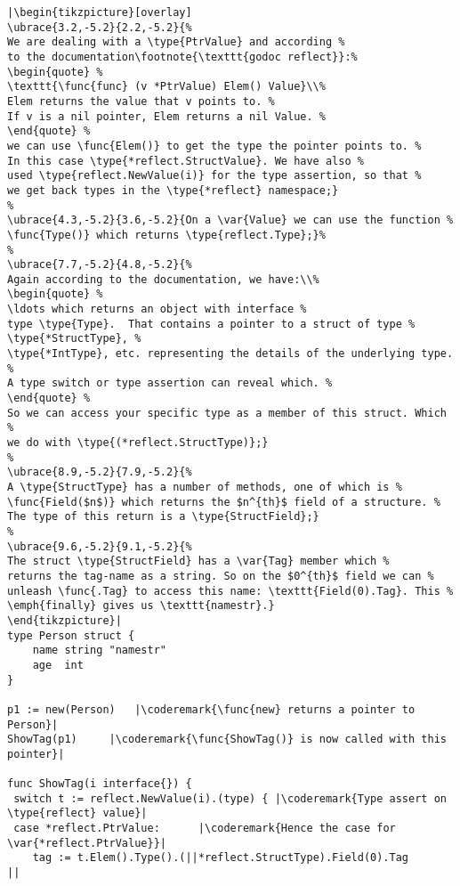 \begin{lstlisting}[caption=Introspection using reflection,label=src:introspection]
|\begin{tikzpicture}[overlay]
\ubrace{3.2,-5.2}{2.2,-5.2}{%
We are dealing with a \type{PtrValue} and according %
to the documentation\footnote{\texttt{godoc reflect}}:%
\begin{quote} %
\texttt{\func{func} (v *PtrValue) Elem() Value}\\%
Elem returns the value that v points to. %
If v is a nil pointer, Elem returns a nil Value. %
\end{quote} %
we can use \func{Elem()} to get the type the pointer points to. %
In this case \type{*reflect.StructValue}. We have also %
used \type{reflect.NewValue(i)} for the type assertion, so that %
we get back types in the \type{*reflect} namespace;}
%
\ubrace{4.3,-5.2}{3.6,-5.2}{On a \var{Value} we can use the function %
\func{Type()} which returns \type{reflect.Type};}%
%
\ubrace{7.7,-5.2}{4.8,-5.2}{%
Again according to the documentation, we have:\\%
\begin{quote} %
\ldots which returns an object with interface %
type \type{Type}.  That contains a pointer to a struct of type %
\type{*StructType}, %
\type{*IntType}, etc. representing the details of the underlying type. %
A type switch or type assertion can reveal which. %
\end{quote} %
So we can access your specific type as a member of this struct. Which %
we do with \type{(*reflect.StructType)};}
%
\ubrace{8.9,-5.2}{7.9,-5.2}{%
A \type{StructType} has a number of methods, one of which is %
\func{Field($n$)} which returns the $n^{th}$ field of a structure. %
The type of this return is a \type{StructField};}
%
\ubrace{9.6,-5.2}{9.1,-5.2}{%
The struct \type{StructField} has a \var{Tag} member which %
returns the tag-name as a string. So on the $0^{th}$ field we can %
unleash \func{.Tag} to access this name: \texttt{Field(0).Tag}. This %
\emph{finally} gives us \texttt{namestr}.}
\end{tikzpicture}|
type Person struct {
    name string "namestr"
    age  int
}

p1 := new(Person)   |\coderemark{\func{new} returns a pointer to Person}|
ShowTag(p1)	    |\coderemark{\func{ShowTag()} is now called with this pointer}|

func ShowTag(i interface{}) {
 switch t := reflect.NewValue(i).(type) { |\coderemark{Type assert on \type{reflect} value}|
 case *reflect.PtrValue:	  |\coderemark{Hence the case for \var{*reflect.PtrValue}}|
	tag := t.Elem().Type().(||*reflect.StructType).Field(0).Tag
||
\end{lstlisting}
